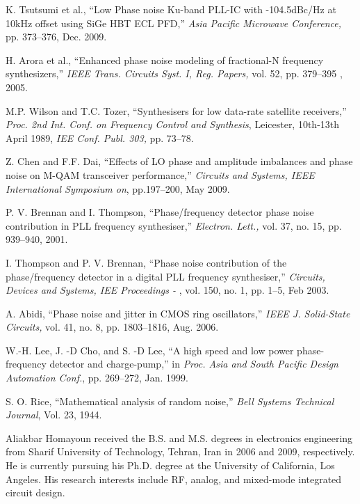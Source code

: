 \begin{thebibliography}{9}

 K. Tsutsumi et al., ``Low Phase noise Ku-band PLL-IC with -104.5dBc/Hz at 10kHz offset using SiGe HBT ECL PFD,''
{\em Asia Pacific Microwave Conference,} pp. 373--376, Dec. 2009.

 H. Arora et al., ``Enhanced phase noise modeling of fractional-N frequency synthesizers,''  {\em IEEE Trans.
Circuits Syst. I, Reg. Papers,}  vol. 52,  pp. 379--395 , 2005.

 M.P. Wilson and T.C. Tozer, ``Synthesisers for low data-rate satellite receivers,'' {\em Proc. 2nd Int. Conf. on Frequency Control and
Synthesis}, Leicester, 10th-13th April 1989, {\em IEE Conf. Publ. 303,} pp. 73--78.

 Z. Chen and F.F. Dai, ``Effects of LO phase and amplitude imbalances and phase noise on M-QAM transceiver
performance,'' {\em Circuits and Systems, IEEE International Symposium on}, pp.197--200, May 2009.

 P. V. Brennan and I. Thompson, ``Phase/frequency detector phase noise contribution in PLL frequency synthesiser,'' {\em Electron. Lett.,} vol. 37,
no. 15, pp. 939--940, 2001.

 I. Thompson and P. V. Brennan, ``Phase noise contribution of the phase/frequency detector in a digital PLL frequency synthesiser,'' {\em
Circuits, Devices and Systems, IEE Proceedings - }, vol. 150, no. 1, pp. 1--5, Feb 2003.

 A. Abidi, ``Phase noise and jitter in CMOS ring oscillators,''
{\em IEEE J. Solid-State Circuits,} vol. 41, no. 8, pp. 1803--1816, Aug. 2006.

 W.-H. Lee, J. -D Cho, and S. -D Lee, ``A high speed and low power phase-frequency detector and charge-pump,'' in {\em Proc. Asia and South
Pacific Design Automation Conf.}, pp. 269--272, Jan. 1999.

 S. O. Rice, ``Mathematical analysis of random noise,'' {\em Bell Systems Technical Journal}, Vol. 23, 1944.

\end{thebibliography}
 

\begin{IEEEbiography}{Aliakbar Homayoun}
received the B.S. and M.S. degrees in electronics engineering
from Sharif University of Technology, Tehran, Iran in 2006 and 2009,
respectively. He is currently pursuing his Ph.D. degree at the University
of California, Los Angeles. His research interests include RF, analog, and mixed-mode
integrated circuit design.
\end{IEEEbiography}

